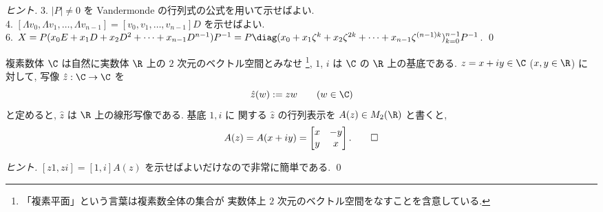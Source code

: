 \documentclass[12pt,twoside]{jarticle}
\begin{document}
\begin{proof}[ヒント]
  3. $|P|\ne 0$ を Vandermonde の行列式の公式を用いて示せばよい.\\
  4. $[\Lambda v_0,\Lambda v_1,\ldots,\Lambda v_{n-1}]
  =[v_0,v_1,\ldots,v_{n-1}]D$ を示せばよい.\\
  6. $X=P(x_0 E+x_1 D+x_2 D^2+\cdots+x_{n-1}D^{n-1})P^{-1} 
  =P\diag(x_0+x_1\zeta^k+x_2\zeta^{2k}
  +\cdots+x_{n-1}\zeta^{(n-1)k})_{k=0}^{n-1}P^{-1}$.
  \qed
\end{proof}



\begin{question}[複素数の実行列表示, 5点]
  \label{q:hatz}
  複素数体 $\C$ は自然に実数体 $\R$ 上の $2$ 次元のベクトル空間とみなせ%
  \footnote{「複素平面」という言葉は複素数全体の集合が
    実数体上 $2$ 次元のベクトル空間をなすことを含意している.}, %
  $1$, $i$ は $\C$ の $\R$ 上の基底である. $z=x+iy\in\C$ ($x,y\in\R$) に
  対して, 写像 $\hat{z}:\C\to\C$ を
  \begin{equation*}
    \hat{z}(w) := zw \qquad (w\in\C)
  \end{equation*}
  と定めると, $\hat{z}$ は $\R$ 上の線形写像である.  基底 $1,i$ に
  関する $\hat{z}$ の行列表示を $A(z)\in M_2(\R)$ と書くと,
  \begin{equation*}
    A(z) = A(x+iy) =
    \begin{bmatrix}
      x & -y \\
      y & x \\
    \end{bmatrix}.
    \qed
  \end{equation*}
\end{question}

\begin{proof}[ヒント]
  $[z1,zi]=[1,i]A(z)$ を示せばよいだけなので非常に簡単である.
  \qed
\end{proof}


\end{document}

